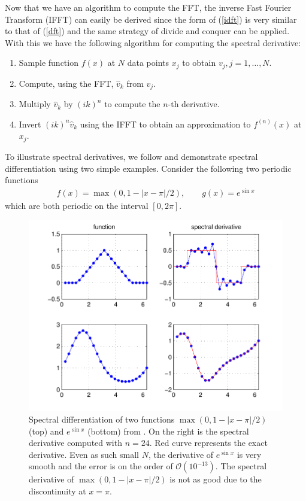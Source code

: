 Now that we have an algorithm to compute the FFT, the inverse Fast Fourier Transform (IFFT) can easily be derived since the form of (\ref{idft}) is very similar to that of (\ref{dft}) and the same strategy of divide and conquer can be applied. With this we have the following algorithm for computing the spectral derivative:
\begin{enumerate} 
\item Sample function $f(x)$ at $N$ data points $x_{j}$ to obtain $v_{j}, j=1,\ldots,N$.
\item Compute, using the FFT, $\hat{v}_{k}$ from $v_{j}$.
\item Multiply $\hat{v}_{k}$ by $(ik)^{n}$ to compute the $n$-th derivative.
\item Invert $(ik)^{n}\hat{v}_{k}$ using the IFFT  to obtain an approximation to $f^{(n)}(x)$ at $x_{j}$. 
\end{enumerate}

To illustrate spectral derivatives, we follow \cite{trefethen_spectral} and demonstrate spectral differentiation using two simple examples. Consider the following two periodic functions
\begin{align}
f(x) = \max(0,1-|x-\pi|/2), \qquad g(x)=e^{\sin x}
\end{align}
which are both periodic on the interval $[0,2\pi]$. 
\begin{figure}
\begin{center}
\includegraphics[width=\textwidth]{spectral_derivatives.pdf}
\caption{Spectral differentiation of two functions $\max(0,1-|x-\pi|/2)$ (top) and $e^{\sin x}$ (bottom) from \cite{trefethen_spectral}. On the right is the spectral derivative computed with $n=24$. Red curve represents the exact derivative. Even as such small $N$, the derivative of $e^{\sin x}$ is very smooth and the error is on the order of $\mathcal{O}(10^{-13})$. The spectral derivative of $\max(0,1-|x-\pi|/2)$ is not as good due to the discontinuity at $x=\pi$.}
\label{spectral_derivatives}
\end{center}
\end{figure}

